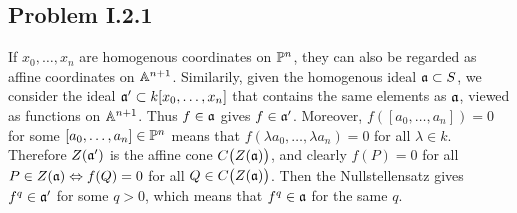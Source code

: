 \documentclass{mathnotes}
\begin{document}
\subsection*{Problem I.2.1}
If $x_0, \dots, x_n$ are homogenous coordinates on $\mathbb{P}^n$, they can also be regarded as affine coordinates on $\mathbb{A}^{n+1}$. Similarily, given the homogenous ideal $\mathfrak a \subset S$, we consider the ideal $\mathfrak a' \subset k[x_0, \dots, x_n]$ that contains the same elements as $\mathfrak a$, viewed as functions on $\mathbb{A}^{n+1}$. Thus $f\in \mathfrak a$ gives $f \in \mathfrak a'$.
 Moreover, $f([a_0 , \dots, a_n]) = 0$ for some $[a_0, \dots, a_n] \in \mathbb{P}^n$ means that $f(\lambda a_0, \dots, \lambda a_n) = 0$ for all $\lambda \in k$. Therefore $Z(\mathfrak a')$ is the affine cone $C\big(Z(\mathfrak a)\big)$, and clearly $f(P) = 0$ for all $P \in Z(\mathfrak a) \Leftrightarrow f(Q) = 0$ for all $Q \in C\big(Z(\mathfrak a)\big)$. Then the Nullstellensatz gives $f^q \in \mathfrak a'$ for some $q>0$, which means that $f^q \in \mathfrak a$ for the same $q$.
\end{document}
